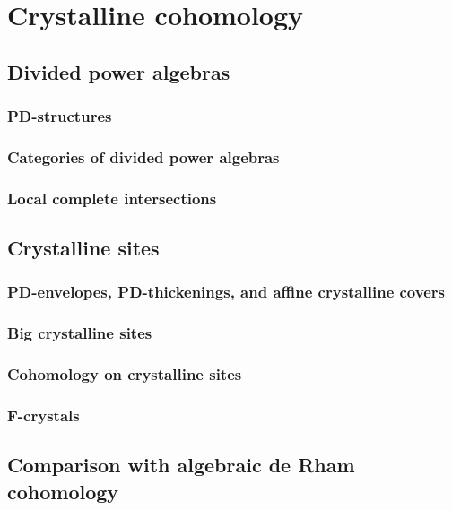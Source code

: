 \section{Crystalline cohomology}
    \subsection{Divided power algebras}
        \subsubsection{PD-structures}
        
        \subsubsection{Categories of divided power algebras}
        
        \subsubsection{Local complete intersections}
        
    \subsection{Crystalline sites}
        \subsubsection{PD-envelopes, PD-thickenings, and affine crystalline covers}
        
        \subsubsection{Big crystalline sites}
        
        \subsubsection{Cohomology on crystalline sites}
        
        \subsubsection{F-crystals}
        
    \subsection{Comparison with algebraic de Rham cohomology}